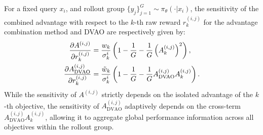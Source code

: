 \documentclass{llmxive}
\begin{document}
\begin{proposition}
    For a fixed query $x_i$, and rollout group $\{y_j\}_{j=1}^G \sim \pi_\theta(\cdot | x_i)$, the sensitivity of the combined advantage with  respect to the $k$-th raw reward $r_k^{(i,j)}$ for the advantage combination method and DVAO are respectively given by:
    \begin{align}
        \frac{\partial A^{(i,j)}}{\partial r_k^{(i,j)}} &= \frac{w_k}{\sigma_k^i} \left( 1 - \frac{1}{G} - \frac{1}{G} \left(A_k^{(i,j)}\right)^2 \right), \notag \\
        \frac{\partial A_\text{DVAO}^{(i,j)}}{\partial r_k^{(i,j)}} &= \frac{\tilde{w}_k}{\sigma_k^i} \left( 1 - \frac{1}{G} - \frac{1}{G} A_\text{DVAO}^{(i,j)} A_k^{(i,j)} \right). \notag
    \end{align}
    While the sensitivity of $A^{(i,j)}$ strictly depends on the isolated advantage of the $k$-th objective, the sensitivity of $A_\text{DVAO}^{(i,j)}$ adaptively depends on the cross-term $A_\text{DVAO}^{(i,j)} A_k^{(i,j)}$, allowing it to aggregate global performance information across all objectives within the rollout group.
\end{proposition}
\end{document}
